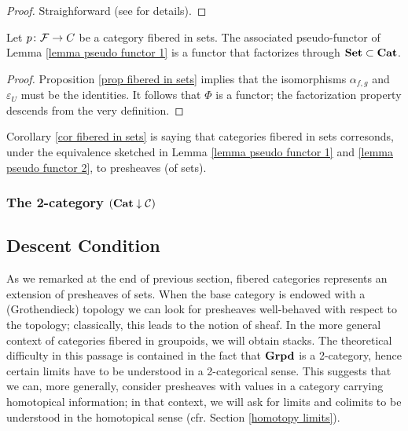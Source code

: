 \begin{proof}
Straighforward (see \cite[Proposition 3.25]{vistoli} for details).
\end{proof}

\begin{cor} \label{cor fibered in sets}
Let $p \colon \mathcal F \to \mathcal \mathcal C$ be a category fibered in sets. The associated pseudo-functor of Lemma \ref{lemma pseudo functor 1} is a functor that factorizes through $\mathbf{Set} \subset \mathbf{Cat}$.
\end{cor}

\begin{proof}
Proposition \ref{prop fibered in sets} implies that the isomorphisms $\alpha_{f,g}$ and $\varepsilon_U$ must be the identities. It follows that $\Phi$ is a functor; the factorization property descends from the very definition.
\end{proof}

\begin{rmk} \label{rmk fibered in sets}
Corollary \ref{cor fibered in sets} is saying that categories fibered in sets corresonds, under the equivalence sketched in Lemma \ref{lemma pseudo functor 1} and \ref{lemma pseudo functor 2}, to presheaves (of sets).
\end{rmk}

\subsubsection{The 2-category $(\mathbf{Cat} \downarrow \mathcal C)$}



\subsection{Descent Condition}

As we remarked at the end of previous section, fibered categories represents an extension of presheaves of sets. When the base category is endowed with a (Grothendieck) topology we can look for presheaves well-behaved with respect to the topology; classically, this leads to the notion of sheaf. In the more general context of categories fibered in groupoids, we will obtain stacks. The theoretical difficulty in this passage is contained in the fact that $\mathbf{Grpd}$ is a 2-category, hence certain limits have to be understood in a 2-categorical sense. This suggests that we can, more generally, consider presheaves with values in a category carrying homotopical information; in that context, we will ask for limits and colimits to be understood in the homotopical sense (cfr. Section \ref{homotopy limits}).

